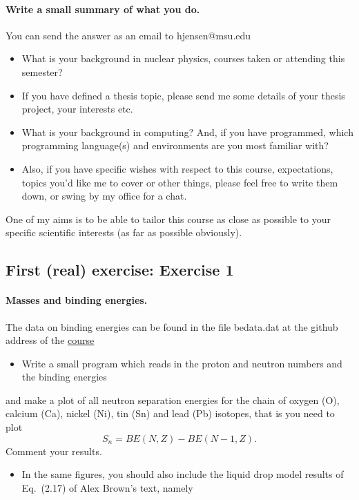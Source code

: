 \documentclass[%
oneside,                 %
final,                   %
10pt]{article}
\begin{document}
\paragraph{Write a small summary of what you do.}
You can send the answer as an email to hjensen@msu.edu
\begin{itemize}
\item What is your background in nuclear physics, courses taken or attending this semester? 

\item If you have defined a thesis topic, please send me some details of your thesis project, your interests etc.

\item What is your background in computing? And, if you have programmed, which programming language(s) and environments  are you  most familiar with?  

\item Also, if you have specific wishes with respect to this course, expectations, topics you'd like me to cover or other things, please feel free to write them down, or swing by my office for a chat. 
\end{itemize}

\noindent
One of my aims is to be able to tailor this course as close as possible to your specific scientific interests (as far as possible obviously).



\subsection{First (real) exercise: Exercise 1}

\paragraph{Masses and binding energies.}
The data on binding energies can be found in the file bedata.dat at the github address of the \href{{https://github.com/NuclearStructure/PHY981/tree/master/doc/pub/spdata/programs}}{course}

\begin{itemize}
  \item Write a small program which reads in the proton and neutron numbers and the binding energies 
\end{itemize}

\noindent
and make a plot of all neutron separation energies for the chain of oxygen (O), calcium (Ca), nickel (Ni), tin (Sn) and lead (Pb) isotopes, that is you need to plot
\[
S_n= BE(N,Z)-BE(N-1,Z).
\]
Comment your results. 
\begin{itemize}
 \item In the same figures, you should also include the liquid drop model results of Eq.~(2.17) of Alex Brown's text, namely
\end{itemize}
\end{document}
